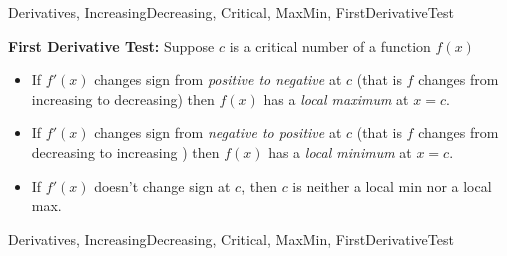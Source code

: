 \begin{tagblock}{Derivatives, IncreasingDecreasing, Critical, MaxMin, FirstDerivativeTest}
\begin{question}
\bigskip

\textbf{First Derivative Test:}  Suppose $c$ is a critical number of a function $f(x)$
\begin{itemize}
\item If $f'(x)$ changes sign from \emph{positive to negative} at $c$ (that is $f$ changes from increasing to decreasing) then $f(x)$ has a \emph{local maximum} at $x=c$.
\item If $f'(x)$ changes sign from \emph{negative to positive} at $c$ (that is $f$ changes from decreasing to increasing ) then $f(x)$ has a \emph{local minimum} at $x=c$.
\item If $f'(x)$ doesn't change sign at $c$, then $c$ is neither a local min nor a local max.  
\end{itemize}

\vspace{.5in}






	
\begin{tags}
	   Derivatives, IncreasingDecreasing, Critical, MaxMin, FirstDerivativeTest
\end{tags}
	
\begin{diary}
\end{diary}
	
\begin{solution}
	   
\end{solution}
	
\end{question}

\end{tagblock}


